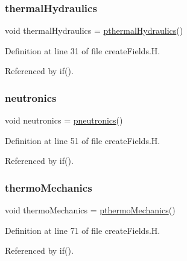 \subsubsection{\texorpdfstring{thermal\+Hydraulics}{thermalHydraulics}}
{\footnotesize\ttfamily void thermal\+Hydraulics = \hyperlink{main_2include_2createFields_8H_a6e7c411942456be713e28f4a4f0341ea}{pthermal\+Hydraulics}()}



Definition at line 31 of file create\+Fields.\+H.



Referenced by if().

\mbox{\label{main_2include_2createFields_8H_aba4910c7964b6a522b7f0b911f652e9d}} 
\subsubsection{\texorpdfstring{neutronics}{neutronics}}
{\footnotesize\ttfamily void neutronics = \hyperlink{main_2include_2createFields_8H_ac65a05feee810b5dd7ed790403f2fe3f}{pneutronics}()}



Definition at line 51 of file create\+Fields.\+H.



Referenced by if().

\mbox{\label{main_2include_2createFields_8H_a8a41bcd60d3796f489966759c96cfa7c}} 
\subsubsection{\texorpdfstring{thermo\+Mechanics}{thermoMechanics}}
{\footnotesize\ttfamily void thermo\+Mechanics = \hyperlink{main_2include_2createFields_8H_ab036d44009bea51e0c6e6dbb1e6778b1}{pthermo\+Mechanics}()}



Definition at line 71 of file create\+Fields.\+H.



Referenced by if().

